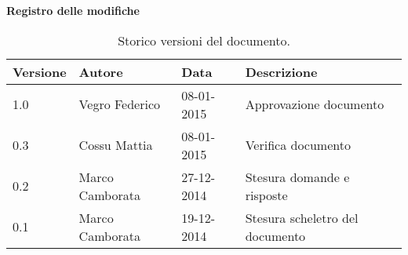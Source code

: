 \begin{Large}
	\textbf{Registro delle modifiche}
\end{Large}

\begin{table}[h]
\begin{center}
\begin{tabular}{|l|l|l|l|}
\hline
\textbf{Versione} & \textbf{Autore} & \textbf{Data} & \textbf{Descrizione} \\
\hline
1.0 & Vegro Federico & 08-01-2015 & Approvazione documento \\
\hline
0.3 & Cossu Mattia & 08-01-2015 & Verifica documento \\
\hline
0.2 & Marco Camborata & 27-12-2014 & Stesura domande e risposte \\
\hline
0.1 & Marco Camborata & 19-12-2014 & Stesura scheletro del documento \\
\hline
\end{tabular}
\caption{Storico versioni del documento.}
\end{center}
\end{table}
